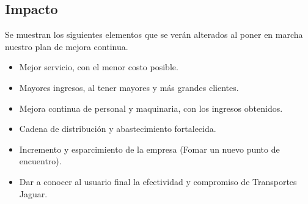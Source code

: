 	\subsection{Impacto}
	Se muestran los siguientes elementos que se verán alterados al poner en marcha nuestro plan de mejora continua.
	\begin{itemize}
		\item Mejor servicio, con el menor costo posible.
		\item Mayores ingresos, al tener mayores y más grandes clientes.
		\item Mejora continua de personal y maquinaria, con los ingresos obtenidos.
		\item Cadena de distribución y abastecimiento fortalecida.
		\item  Incremento y esparcimiento de la empresa (Fomar un nuevo punto de encuentro).
		\item Dar a conocer al usuario final la efectividad y compromiso de Transportes Jaguar.
	\end{itemize}